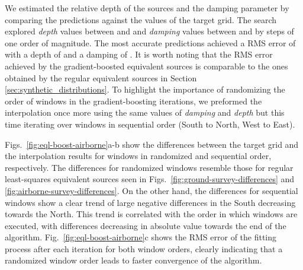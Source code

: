 We estimated the relative depth of the sources and the damping parameter by
comparing the predictions against the values of the target grid.
The search explored \emph{depth} values between \EqlBoostAirborneMinDepth{} and
\EqlBoostAirborneMaxDepth{} and \emph{damping} values between
\EqlBoostAirborneMinDamping{} and \EqlBoostAirborneMaxDamping{} by steps of one
order of magnitude.
The most accurate predictions achieved a RMS error of
\EqlBoostAirborneRmsScore{} with a depth of \EqlBoostAirborneDepth{} and
a damping of \EqlBoostAirborneDamping{}.
It is worth noting that the RMS error achieved by the gradient-boosted
equivalent sources is comparable to the ones obtained by the regular equivalent
sources in Section \ref{sec:synthetic_distributions}.
To highlight the importance of randomizing the order of windows in the
gradient-boosting iterations, we preformed the interpolation once more using
the same values of \emph{damping} and \emph{depth} but this time iterating over
windows in sequential order (South to North, West to East).

Figs.~\ref{fig:eql-boost-airborne}a-b show the differences between the target
grid and the interpolation results for windows in randomized and sequential
order, respectively.
The differences for randomized windows resemble those for regular least-squares
equivalent sources seen in Figs.~\ref{fig:ground-survey-differences} and
\ref{fig:airborne-survey-differences}.
On the other hand, the differences for sequential windows show a clear
trend of large negative differences in the South decreasing towards the North.
This trend is correlated with the order in which windows are executed, with
differences decreasing in absolute value towards the end of the algorithm.
Fig.~\ref{fig:eql-boost-airborne}c shows the RMS error of the fitting process
after each iteration for both window orders, clearly indicating that
a randomized window order leads to faster convergence of the algorithm.

